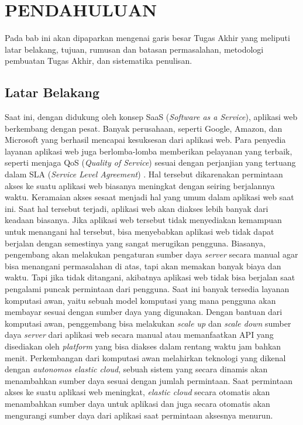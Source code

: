 \chapter{PENDAHULUAN}
	Pada bab ini akan dipaparkan mengenai garis besar Tugas Akhir yang meliputi latar belakang, tujuan, rumusan dan batasan permasalahan, metodologi pembuatan Tugas Akhir, dan sistematika penulisan.
        
	\section{Latar Belakang}
		Saat ini, dengan didukung oleh konsep SaaS (\textit{Software as a Service}), aplikasi web berkembang dengan pesat. Banyak perusahaan, seperti Google, Amazon, dan Microsoft yang berhasil mencapai kesuksesan dari aplikasi web. Para penyedia layanan aplikasi web juga berlomba-lomba memberikan pelayanan yang terbaik, seperti menjaga QoS (\textit{Quality of Service}) sesuai dengan perjanjian yang tertuang dalam SLA (\textit{Service Level Agreement}) \cite{kan_docloud:_2016}. Hal tersebut dikarenakan permintaan akses ke suatu aplikasi web biasanya meningkat dengan seiring berjalannya waktu. Keramaian akses sesaat menjadi hal yang umum dalam aplikasi web saat ini. Saat hal tersebut terjadi, aplikasi web akan diakses lebih banyak dari keadaan biasanya. Jika aplikasi web tersebut tidak menyediakan kemampuan untuk menangani hal tersebut, bisa menyebabkan aplikasi web tidak dapat berjalan dengan semestinya yang sangat merugikan pengguna. Biasanya, pengembang akan melakukan pengaturan sumber daya \textit{server} secara manual agar bisa menangani permasalahan di atas, tapi akan memakan banyak biaya dan waktu. Tapi jika tidak ditangani, akibatnya aplikasi web tidak bisa berjalan saat pengalami puncak permintaan dari pengguna. Saat ini banyak tersedia layanan komputasi awan, yaitu sebuah model komputasi yang mana pengguna akan membayar sesuai dengan sumber daya yang digunakan. Dengan bantuan dari komputasi awan, penggembang bisa melakukan \textit{scale up} dan \textit{scale down} sumber daya \textit{server} dari aplikasi web secara manual atau memanfaatkan API yang disediakan oleh \textit{platform} yang bisa diakses dalam rentang waktu jam bahkan menit. Perkembangan dari komputasi awan melahirkan teknologi yang dikenal dengan \textit{autonomos elastic cloud}, sebuah sistem yang secara dinamis akan menambahkan sumber daya sesuai dengan jumlah permintaan. Saat permintaan akses ke suatu aplikasi web meningkat, \textit{elastic cloud} secara otomatis akan menambahkan sumber daya untuk aplikasi dan juga secara otomatis akan mengurangi sumber daya dari aplikasi saat permintaan aksesnya menurun.\\
